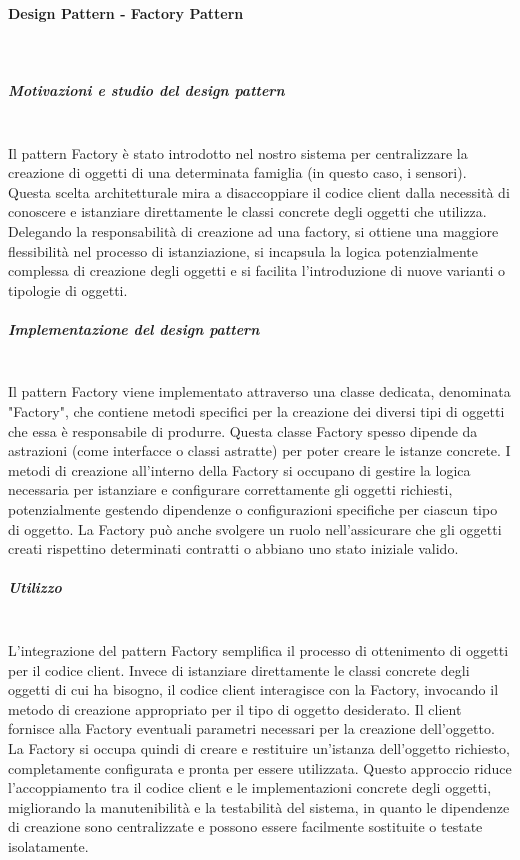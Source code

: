 \documentclass[10pt]{article}
\newcommand{\myparagraph}[1]{\paragraph{#1}\mbox{}\\}
\newcommand{\mysubparagraph}[1]{\subparagraph{#1}\mbox{}\\}
\begin{document}
\myparagraph{Design Pattern - Factory Pattern}

    \mysubparagraph{Motivazioni e studio del design pattern}
    Il pattern Factory è stato introdotto nel nostro sistema per centralizzare la creazione di oggetti di una determinata famiglia (in questo caso, i sensori). Questa scelta architetturale mira a disaccoppiare il codice client dalla necessità di conoscere e istanziare direttamente le classi concrete degli oggetti che utilizza. Delegando la responsabilità di creazione ad una factory, si ottiene una maggiore flessibilità nel processo di istanziazione, si incapsula la logica potenzialmente complessa di creazione degli oggetti e si facilita l'introduzione di nuove varianti o tipologie di oggetti.

    \mysubparagraph{Implementazione del design pattern}
    Il pattern Factory viene implementato attraverso una classe dedicata, denominata "Factory", che contiene metodi specifici per la creazione dei diversi tipi di oggetti che essa è responsabile di produrre. Questa classe Factory spesso dipende da astrazioni (come interfacce o classi astratte) per poter creare le istanze concrete. I metodi di creazione all'interno della Factory si occupano di gestire la logica necessaria per istanziare e configurare correttamente gli oggetti richiesti, potenzialmente gestendo dipendenze o configurazioni specifiche per ciascun tipo di oggetto. La Factory può anche svolgere un ruolo nell'assicurare che gli oggetti creati rispettino determinati contratti o abbiano uno stato iniziale valido.

    \mysubparagraph{Utilizzo}
    L'integrazione del pattern Factory semplifica il processo di ottenimento di oggetti per il codice client. Invece di istanziare direttamente le classi concrete degli oggetti di cui ha bisogno, il codice client interagisce con la Factory, invocando il metodo di creazione appropriato per il tipo di oggetto desiderato. Il client fornisce alla Factory eventuali parametri necessari per la creazione dell'oggetto. La Factory si occupa quindi di creare e restituire un'istanza dell'oggetto richiesto, completamente configurata e pronta per essere utilizzata. Questo approccio riduce l'accoppiamento tra il codice client e le implementazioni concrete degli oggetti, migliorando la manutenibilità e la testabilità del sistema, in quanto le dipendenze di creazione sono centralizzate e possono essere facilmente sostituite o testate isolatamente.
\end{document}
